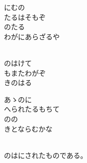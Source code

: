 \documentclass[10pt,b5j]{tarticle} %
\begin{document}
\begin{enumerate}
\begin{minipage}[c]{\blocksize}
        \vspace{\linespace}
        \item
        にむの\\
        たるはそもぞ\\
        のたる\\
        わがにあらざるや
        
        \vspace{\linespace}
        \item
        \\
        のはけて\\
        もまたわがぞ\\
        きのはる
        
        \vspace{\linespace}
        \item
        あゝのに\\
        へられたるもちて\\
        のの\\
        きとならむかな
        
        \vspace{\linespace}
        \item
        \\
        のはにされたものである。
    
    \end{minipage}
\end{enumerate} %
\end{document}
